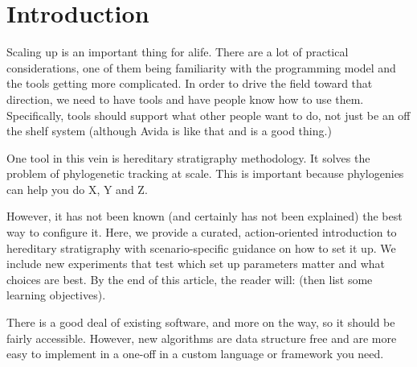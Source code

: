 \section{Introduction} \label{sec:introduction}

Scaling up is an important thing for alife.
There are a lot of practical considerations, one of them being familiarity with the programming model and the tools getting more complicated.
In order to drive the field toward that direction, we need to have tools and have people know how to use them.
Specifically, tools should support what other people want to do, not just be an off the shelf system (although Avida is like that and is a good thing.)

One tool in this vein is hereditary stratigraphy methodology.
It solves the problem of phylogenetic tracking at scale.
This is important because phylogenies can help you do X, Y and Z.

However, it has not been known (and certainly has not been explained) the best way to configure it.
Here, we provide a curated, action-oriented introduction to hereditary stratigraphy with scenario-specific guidance on how to set it up.
We include new experiments that test which set up parameters matter and what choices are best.
By the end of this article, the reader will: (then list some learning objectives).

There is a good deal of existing software, and more on the way, so it should be fairly accessible.
However, new algorithms are data structure free and are more easy to implement in a one-off in a custom language or framework you need.

